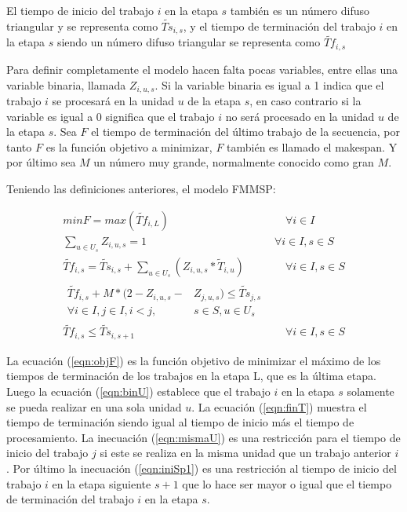 \documentclass{article}
\begin{document}
El tiempo de inicio del trabajo $i$ en la etapa $s$ también es un número difuso triangular y se representa como $\widetilde{Ts}_{i,s}$, y el tiempo de terminación del trabajo $i$ en la etapa $s$ siendo un número difuso triangular se representa como $\widetilde{Tf}_{i,s}$

\vspace{\baselineskip}
Para definir completamente el modelo hacen falta pocas variables, entre ellas una variable binaria, llamada $Z_{i,u,s}$. Si la variable binaria es igual a 1 indica que el trabajo $i$ se procesará en la unidad $u$ de la etapa $s$, en caso contrario si la variable es igual a 0 significa que el trabajo $i$ no será procesado en la unidad $u$ de la etapa $s$. Sea $F$ el tiempo de terminación del último trabajo de la secuencia, por tanto $F$ es la función objetivo a minimizar, $F$ también es llamado el makespan. Y por último sea $M$ un número muy grande, normalmente conocido como gran $M$.

\pagebreak

\vspace{\baselineskip}
Teniendo las definiciones anteriores, el modelo FMMSP:

\begin{align}
    \label{eqn:objF}
    min F = max(\widetilde{Tf}_{i,L}) &\quad\forall i \in I\\
    \label{eqn:binU}
    \sum_{u \in U_{s}} Z_{i,u,s} = 1 \qquad
    \qquad\quad &\forall i \in I, s \in S\\
    \label{eqn:finT}
    \widetilde{Tf}_{i,s} = \widetilde{Ts}_{i,s} + \sum_{u \in U_{s}}
    (Z_{i,u,s}*\tilde{T}_{i,u}) &\quad\forall i \in I, s \in S\\
    \begin{split}
        \label{eqn:mismaU}
        \widetilde{Tf}_{i,s} + M*(2-Z_{i,u,s}-&Z_{j,u,s}) \leq 
        \widetilde{Ts}_{j,s} \\
        \forall i \in I, j \in I, i < j,& s \in S, u \in U_{s}    
    \end{split}\\
    \label{eqn:iniSp1}
    \widetilde{Tf}_{i,s} \leq \widetilde{Ts}_{i,s+1} &\quad\forall i \in I,s \in S
\end{align}

La ecuación (\ref{eqn:objF}) es la función objetivo de minimizar el máximo de los tiempos de terminación de los trabajos en la etapa L, que es la última etapa. Luego la ecuación (\ref{eqn:binU}) establece que el trabajo $i$ en la etapa $s$ solamente se pueda realizar en una sola unidad $u$. La ecuación (\ref{eqn:finT}) muestra el tiempo de terminación siendo igual al tiempo de inicio más el tiempo de procesamiento. La inecuación (\ref{eqn:mismaU}) es una restricción para el tiempo de inicio del trabajo $j$ si este se realiza en la misma unidad que un trabajo anterior $i$. Por último la inecuación (\ref{eqn:iniSp1}) es una restricción al tiempo de inicio del trabajo $i$ en la etapa siguiente $s+1$ que lo hace ser mayor o igual que el tiempo de terminación del trabajo $i$ en la etapa $s$. \autocite{modFMMSP}
\end{document}
